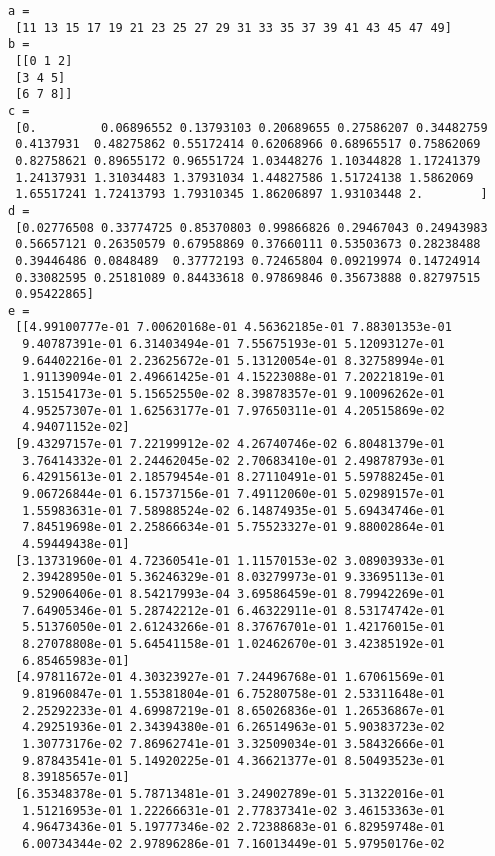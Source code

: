 \documentclass[11pt]{article}
\begin{document}
    \begin{Verbatim}[commandchars=\\\{\}]
a =
 [11 13 15 17 19 21 23 25 27 29 31 33 35 37 39 41 43 45 47 49]
b =
 [[0 1 2]
 [3 4 5]
 [6 7 8]]
c =
 [0.         0.06896552 0.13793103 0.20689655 0.27586207 0.34482759
 0.4137931  0.48275862 0.55172414 0.62068966 0.68965517 0.75862069
 0.82758621 0.89655172 0.96551724 1.03448276 1.10344828 1.17241379
 1.24137931 1.31034483 1.37931034 1.44827586 1.51724138 1.5862069
 1.65517241 1.72413793 1.79310345 1.86206897 1.93103448 2.        ]
d =
 [0.02776508 0.33774725 0.85370803 0.99866826 0.29467043 0.24943983
 0.56657121 0.26350579 0.67958869 0.37660111 0.53503673 0.28238488
 0.39446486 0.0848489  0.37772193 0.72465804 0.09219974 0.14724914
 0.33082595 0.25181089 0.84433618 0.97869846 0.35673888 0.82797515
 0.95422865]
e =
 [[4.99100777e-01 7.00620168e-01 4.56362185e-01 7.88301353e-01
  9.40787391e-01 6.31403494e-01 7.55675193e-01 5.12093127e-01
  9.64402216e-01 2.23625672e-01 5.13120054e-01 8.32758994e-01
  1.91139094e-01 2.49661425e-01 4.15223088e-01 7.20221819e-01
  3.15154173e-01 5.15652550e-02 8.39878357e-01 9.10096262e-01
  4.95257307e-01 1.62563177e-01 7.97650311e-01 4.20515869e-02
  4.94071152e-02]
 [9.43297157e-01 7.22199912e-02 4.26740746e-02 6.80481379e-01
  3.76414332e-01 2.24462045e-02 2.70683410e-01 2.49878793e-01
  6.42915613e-01 2.18579454e-01 8.27110491e-01 5.59788245e-01
  9.06726844e-01 6.15737156e-01 7.49112060e-01 5.02989157e-01
  1.55983631e-01 7.58988524e-02 6.14874935e-01 5.69434746e-01
  7.84519698e-01 2.25866634e-01 5.75523327e-01 9.88002864e-01
  4.59449438e-01]
 [3.13731960e-01 4.72360541e-01 1.11570153e-02 3.08903933e-01
  2.39428950e-01 5.36246329e-01 8.03279973e-01 9.33695113e-01
  9.52906406e-01 8.54217993e-04 3.69586459e-01 8.79942269e-01
  7.64905346e-01 5.28742212e-01 6.46322911e-01 8.53174742e-01
  5.51376050e-01 2.61243266e-01 8.37676701e-01 1.42176015e-01
  8.27078808e-01 5.64541158e-01 1.02462670e-01 3.42385192e-01
  6.85465983e-01]
 [4.97811672e-01 4.30323927e-01 7.24496768e-01 1.67061569e-01
  9.81960847e-01 1.55381804e-01 6.75280758e-01 2.53311648e-01
  2.25292233e-01 4.69987219e-01 8.65026836e-01 1.26536867e-01
  4.29251936e-01 2.34394380e-01 6.26514963e-01 5.90383723e-02
  1.30773176e-02 7.86962741e-01 3.32509034e-01 3.58432666e-01
  9.87843541e-01 5.14920225e-01 4.36621377e-01 8.50493523e-01
  8.39185657e-01]
 [6.35348378e-01 5.78713481e-01 3.24902789e-01 5.31322016e-01
  1.51216953e-01 1.22266631e-01 2.77837341e-02 3.46153363e-01
  4.96473436e-01 5.19777346e-02 2.72388683e-01 6.82959748e-01
  6.00734344e-02 2.97896286e-01 7.16013449e-01 5.97950176e-02

\end{Verbatim}
\end{document}
